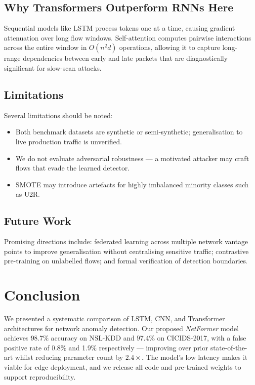 \documentclass[conference]{IEEEtran}
\begin{document}
\subsection{Why Transformers Outperform RNNs Here}

Sequential models like LSTM process tokens one at a time, causing
gradient attenuation over long flow windows. Self-attention computes
pairwise interactions across the entire window in $O(n^2 d)$ operations,
allowing it to capture long-range dependencies between early and late
packets that are diagnostically significant for slow-scan attacks.

\subsection{Limitations}

Several limitations should be noted:
\begin{itemize}
	\item Both benchmark datasets are synthetic or semi-synthetic;
	      generalisation to live production traffic is unverified.
	\item We do not evaluate adversarial robustness --- a motivated
	      attacker may craft flows that evade the learned detector.
	\item SMOTE may introduce artefacts for highly imbalanced minority
	      classes such as U2R.
\end{itemize}

\subsection{Future Work}

Promising directions include: federated learning across multiple
network vantage points to improve generalisation without centralising
sensitive traffic; contrastive pre-training on unlabelled flows; and
formal verification of detection boundaries.

\section{Conclusion}
\label{sec:conclusion}

We presented a systematic comparison of LSTM, CNN, and Transformer
architectures for network anomaly detection. Our proposed
\textit{NetFormer} model achieves 98.7\% accuracy on NSL-KDD and
97.4\% on CICIDS-2017, with a false positive rate of 0.8\% and
1.9\% respectively --- improving over prior state-of-the-art whilst
reducing parameter count by $2.4\times$. The model's low latency
makes it viable for edge deployment, and we release all code and
pre-trained weights to support reproducibility.
\end{document}
